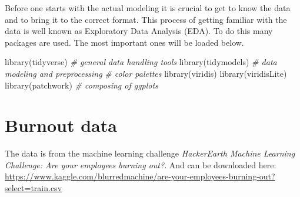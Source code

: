 \documentclass[
]{book}
\newenvironment{Shaded}{\begin{snugshade}}{\end{snugshade}}
\newcommand{\CommentTok}[1]{\textcolor[rgb]{0.56,0.35,0.01}{\textit{#1}}}
\newcommand{\FunctionTok}[1]{\textcolor[rgb]{0.00,0.00,0.00}{#1}}
\newcommand{\NormalTok}[1]{#1}
\newcommand{\OtherTok}[1]{\textcolor[rgb]{0.56,0.35,0.01}{#1}}
\newcommand{\SpecialCharTok}[1]{\textcolor[rgb]{0.00,0.00,0.00}{#1}}
\newcommand{\StringTok}[1]{\textcolor[rgb]{0.31,0.60,0.02}{#1}}
\begin{document}
Before one starts with the actual modeling it is crucial to get to know the data and to bring it to the correct format. This process of getting familiar with the data is well known as Exploratory Data Analysis (EDA). To do this many packages are used.\citetext{\citealp{tidyverse}; \citealp{tidymodels}; \citealp{viridis}; \citealp{ggtext}; \citealp[ ]{viridisLite}; \citealp{patchwork}; \citealp{visdat}; \citealp{lubridate}} The most important ones will be loaded below.

\begin{Shaded}
\begin{Highlighting}[]
\FunctionTok{library}\NormalTok{(tidyverse) }\CommentTok{\# general data handling tools}
\FunctionTok{library}\NormalTok{(tidymodels) }\CommentTok{\# data modeling and preprocessing}
\CommentTok{\# color palettes}
\FunctionTok{library}\NormalTok{(viridis)}
\FunctionTok{library}\NormalTok{(viridisLite)}
\FunctionTok{library}\NormalTok{(patchwork) }\CommentTok{\# composing of ggplots}
\end{Highlighting}
\end{Shaded}

\hypertarget{burnout-data}{%
\section{Burnout data}\label{burnout-data}}

The data is from the machine learning challenge \emph{HackerEarth Machine Learning Challenge: Are your employees burning out?}. And can be downloaded here: \url{https://www.kaggle.com/blurredmachine/are-your-employees-burning-out?select=train.csv}

\begin{Shaded}
\end{Shaded}
\end{document}
